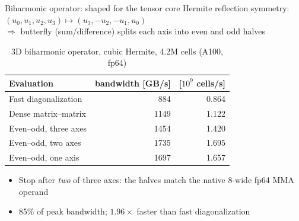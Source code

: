 \documentclass{beamer}
\begin{document}
\begin{frame}{Biharmonic operator: shaped for the tensor core}
    \small
    Hermite reflection symmetry: $(u_0,u_1,u_2,u_3) \mapsto (u_3,-u_2,-u_1,u_0)$\\
    $\Rightarrow$ butterfly (sum/difference) splits each axis into even and odd halves
    \vfill
    \begin{table}
        \centering
        \caption{3D biharmonic operator, cubic Hermite, 4.2M cells (A100, fp64)}
        \footnotesize
        \begin{tabular}{lrr}
            \toprule
            Evaluation                  & bandwidth [GB/s] & [$10^9$ cells/s] \\
            \midrule
            Fast diagonalization        & 884              & 0.864            \\
            Dense matrix--matrix        & 1149             & 1.122            \\
            Even--odd, three axes       & 1454             & 1.420            \\
            \alert{Even--odd, two axes} & \alert{1735}     & \alert{1.695}    \\
            Even--odd, one axis         & 1697             & 1.657            \\
            \bottomrule
        \end{tabular}
    \end{table}
    \begin{itemize}
        \item Stop after \emph{two} of three axes: the halves match the native $8$-wide fp64 MMA operand
        \item \alert{85\% of peak bandwidth}; $1.96\times$ faster than fast diagonalization
    \end{itemize}
\end{frame}
\end{document}
